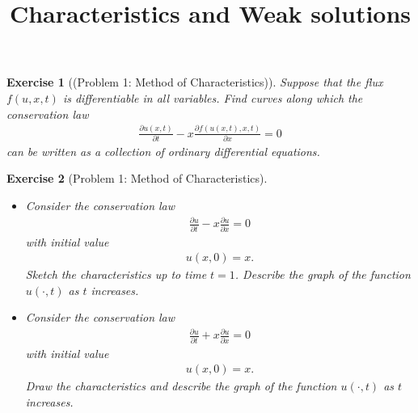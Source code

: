 \documentclass[10pt,letterpaper]{article}
\theoremstyle{break}
\newtheorem{exercise}{Exercise}
\begin{document}
\title{Characteristics and Weak solutions}
\date{}




















\begin{exercise}[(Problem 1: Method of Characteristics)]

	Suppose that the flux $f(u,x,t)$ is differentiable in all variables.
	Find curves along which the conservation law 
	\begin{align}
		\frac{\partial u(x,t)}{\partial t}
		-
		x
		\frac{\partial f(u(x,t),x,t)}{\partial x}
		= 0
	\end{align}
	can be written as a collection of ordinary differential equations.
\end{exercise}

\begin{solution}
	
\end{solution}
	











\begin{exercise}[Problem 1: Method of Characteristics]
	${}$%
	\begin{itemize}
	\item[(i)] Consider the conservation law 
	\begin{align}
		\frac{\partial u}{\partial t}
		-
		x
		\frac{\partial u}{\partial x}
		= 0
	\end{align}
	with initial value
	\begin{align}
		u(x,0)=x.
	\end{align}
	Sketch the characteristics up to time $t=1$. Describe the graph of the function $u(\cdot,t)$
	as $t$ increases.
	\item[(ii)] Consider the conservation law
	\begin{align}
		\frac{\partial u}{\partial t}
		+
		x
		\frac{\partial u}{\partial x}
		= 0
	\end{align}
	with initial value
	\begin{align}
		u(x,0)=x.
	\end{align}
	Draw the characteristics and describe the graph of the function $u(\cdot,t)$ as $t$ increases.
	\end{itemize}
\end{exercise}
\end{document}
